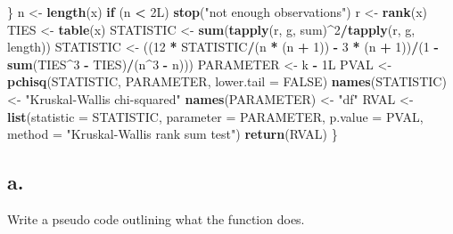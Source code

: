 \documentclass[
]{article}
\newenvironment{Shaded}{\begin{snugshade}}{\end{snugshade}}
\newcommand{\AttributeTok}[1]{\textcolor[rgb]{0.13,0.29,0.53}{#1}}
\newcommand{\ConstantTok}[1]{\textcolor[rgb]{0.56,0.35,0.01}{#1}}
\newcommand{\ControlFlowTok}[1]{\textcolor[rgb]{0.13,0.29,0.53}{\textbf{#1}}}
\newcommand{\DataTypeTok}[1]{\textcolor[rgb]{0.13,0.29,0.53}{#1}}
\newcommand{\DecValTok}[1]{\textcolor[rgb]{0.00,0.00,0.81}{#1}}
\newcommand{\FunctionTok}[1]{\textcolor[rgb]{0.13,0.29,0.53}{\textbf{#1}}}
\newcommand{\NormalTok}[1]{#1}
\newcommand{\OtherTok}[1]{\textcolor[rgb]{0.56,0.35,0.01}{#1}}
\newcommand{\SpecialCharTok}[1]{\textcolor[rgb]{0.81,0.36,0.00}{\textbf{#1}}}
\newcommand{\StringTok}[1]{\textcolor[rgb]{0.31,0.60,0.02}{#1}}
\begin{document}
\begin{Shaded}
\begin{Highlighting}[]
\NormalTok{    \}}
\NormalTok{    n }\OtherTok{\textless{}{-}} \FunctionTok{length}\NormalTok{(x)}
    \ControlFlowTok{if}\NormalTok{ (n }\SpecialCharTok{\textless{}} \DecValTok{2}\DataTypeTok{L}\NormalTok{) }
        \FunctionTok{stop}\NormalTok{(}\StringTok{"not enough observations"}\NormalTok{)}
\NormalTok{    r }\OtherTok{\textless{}{-}} \FunctionTok{rank}\NormalTok{(x)}
\NormalTok{    TIES }\OtherTok{\textless{}{-}} \FunctionTok{table}\NormalTok{(x)}
\NormalTok{    STATISTIC }\OtherTok{\textless{}{-}} \FunctionTok{sum}\NormalTok{(}\FunctionTok{tapply}\NormalTok{(r, g, sum)}\SpecialCharTok{\^{}}\DecValTok{2}\SpecialCharTok{/}\FunctionTok{tapply}\NormalTok{(r, g, length))}
\NormalTok{    STATISTIC }\OtherTok{\textless{}{-}}\NormalTok{ ((}\DecValTok{12} \SpecialCharTok{*}\NormalTok{ STATISTIC}\SpecialCharTok{/}\NormalTok{(n }\SpecialCharTok{*}\NormalTok{ (n }\SpecialCharTok{+} \DecValTok{1}\NormalTok{)) }\SpecialCharTok{{-}} \DecValTok{3} \SpecialCharTok{*}\NormalTok{ (n }\SpecialCharTok{+} \DecValTok{1}\NormalTok{))}\SpecialCharTok{/}\NormalTok{(}\DecValTok{1} \SpecialCharTok{{-}} 
        \FunctionTok{sum}\NormalTok{(TIES}\SpecialCharTok{\^{}}\DecValTok{3} \SpecialCharTok{{-}}\NormalTok{ TIES)}\SpecialCharTok{/}\NormalTok{(n}\SpecialCharTok{\^{}}\DecValTok{3} \SpecialCharTok{{-}}\NormalTok{ n)))}
\NormalTok{    PARAMETER }\OtherTok{\textless{}{-}}\NormalTok{ k }\SpecialCharTok{{-}} \DecValTok{1}\DataTypeTok{L}
\NormalTok{    PVAL }\OtherTok{\textless{}{-}} \FunctionTok{pchisq}\NormalTok{(STATISTIC, PARAMETER, }\AttributeTok{lower.tail =} \ConstantTok{FALSE}\NormalTok{)}
    \FunctionTok{names}\NormalTok{(STATISTIC) }\OtherTok{\textless{}{-}} \StringTok{"Kruskal{-}Wallis chi{-}squared"}
    \FunctionTok{names}\NormalTok{(PARAMETER) }\OtherTok{\textless{}{-}} \StringTok{"df"}
\NormalTok{    RVAL }\OtherTok{\textless{}{-}} \FunctionTok{list}\NormalTok{(}\AttributeTok{statistic =}\NormalTok{ STATISTIC, }\AttributeTok{parameter =}\NormalTok{ PARAMETER, }
        \AttributeTok{p.value =}\NormalTok{ PVAL, }\AttributeTok{method =} \StringTok{"Kruskal{-}Wallis rank sum test"}\NormalTok{)}
    \FunctionTok{return}\NormalTok{(RVAL)}
\NormalTok{\}}
\end{Highlighting}
\end{Shaded}

\subsection{a.}\label{a.-5}

Write a pseudo code outlining what the function does.
\end{document}
